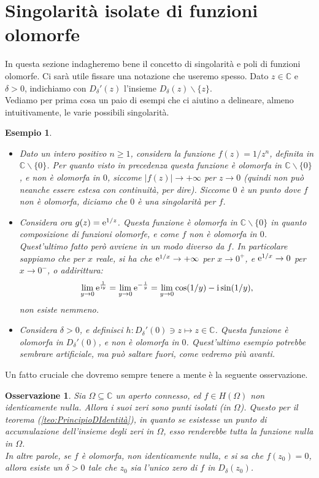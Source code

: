 \documentclass[11pt]{book}
\theoremstyle{Definizione}
\theoremstyle{TeoremaProposizioneLemmaCorollarioCongettura}
\theoremstyle{OsservazioneNotaEsempio}
\newtheorem{myobs}{Osservazione}[section]
\newtheorem{myes}{Esempio}[section]
\newcommand{\C}{\mathbb{C}}
\newcommand{\Disc}[3][]{D^{#1}_{{#2}}({#3})}
\newcommand{\DiscPunt}[2]{D_{#1}'({#2})}
\newcommand{\tolto}{\smallsetminus}
\renewcommand{\i}{\textup{i}}
\newcommand{\e}{\textup{e}}
\begin{document}
\section{Singolarità isolate di funzioni olomorfe}
In questa sezione indagheremo bene il concetto di singolarità e poli di funzioni olomorfe. Ci sarà utile fissare una notazione che useremo spesso. Dato $z\in \C$ e $\delta > 0$, indichiamo con $\DiscPunt{\delta}{z}$ l'insieme $\Disc{\delta}{z}\tolto \{z\}$.\\
Vediamo per prima cosa un paio di esempi che ci aiutino a delineare, almeno intuitivamente, le varie possibili singolarità.
\begin{myes}\hfill
\begin{itemize}
\item[$(i)$] Dato un intero positivo $n \geq 1$, considera la funzione $f(z) = 1/z^{n}$, definita in $\C \tolto \{0\}$. Per quanto visto in precedenza questa funzione è olomorfa in $\C \tolto \{0\}$, e non è olomorfa in $0$, siccome $|f(z)| \to +\infty$ per $z \to 0$ (quindi non può neanche essere estesa con continuità, per dire). Siccome $0$ è un punto dove $f$ non è olomorfa, diciamo che $0$ è una singolarità per $f$.
\item[$(ii)$] Considera ora $g(z) = \e^{1/z}$. Questa funzione è olomorfa in $\C \tolto \{0\}$ in quanto composizione di funzioni olomorfe, e come $f$ non è olomorfa in $0$. Quest'ultimo fatto però avviene in un modo diverso da $f$. In particolare sappiamo che per $x$ reale, si ha che $\e^{1/x} \to +\infty$ per $x \to 0^+$, e $\e^{1/x} \to 0$ per $x \to 0^-$, o addirittura:
$$
\lim_{y \to 0} \e^{\frac{1}{\i y}} = \lim_{y \to 0} \e^{-\frac{\i}{y}} = \lim_{y \to 0} \cos(1/y)-\i\sin(1/y),
$$
non esiste nemmeno.
\item[$(iii)$] Considera $\delta > 0$, e definisci $h : \DiscPunt{\delta}{0} \ni z \longmapsto z\in \C$. Questa funzione è olomorfa in $\DiscPunt{\delta}{0}$, e non è olomorfa in $0$. Quest'ultimo esempio potrebbe sembrare artificiale, ma può saltare fuori, come vedremo più avanti.
\end{itemize}
\end{myes}
Un fatto cruciale che dovremo sempre tenere a mente è la seguente osservazione.
\begin{myobs}
Sia $\Omega\subseteq \C$ un aperto connesso, ed $f \in H(\Omega)$ non identicamente nulla. Allora i suoi zeri sono punti isolati (in $\Omega$). Questo per il teorema (\ref{teo:PrincipioDIdentità}), in quanto se esistesse un punto di accumulazione dell'insieme degli zeri in $\Omega$, esso renderebbe tutta la funzione nulla in $\Omega$.\\
In altre parole, se $f$ è olomorfa, non identicamente nulla, e si sa che $f(z_0) = 0$, allora esiste un $\delta > 0$ tale che $z_0$ sia l'unico zero di $f$ in $\Disc{\delta}{z_0}$.
\end{myobs}
\end{document}
